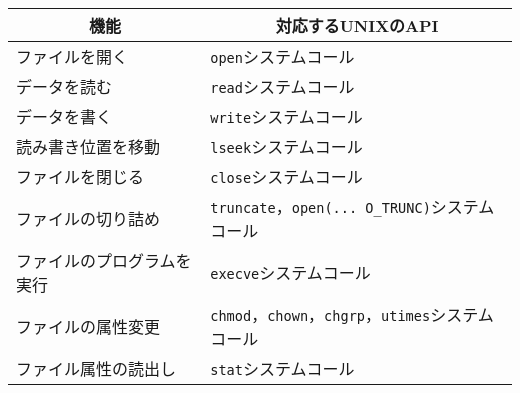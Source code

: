 \documentclass{standalone}
\def\|{\verb|} %|
\begin{document}
\begin{tabular}{l | l}\hline\hline
  \multicolumn{1}{c|}{機能} & \multicolumn{1}{c}{対応するUNIXのAPI}\\\hline
  ファイルを開く     & \|open|システムコール \\
  データを読む       & \|read|システムコール \\
  データを書く       & \|write|システムコール \\
  読み書き位置を移動 & \|lseek|システムコール \\
  ファイルを閉じる   & \|close|システムコール \\
  ファイルの切り詰め & \|truncate|，\|open(... O_TRUNC)|システムコール \\
  ファイルのプログラムを実行 & \|execve|システムコール \\
  ファイルの属性変更 & \|chmod|，\|chown|，\|chgrp|，\|utimes|システムコール \\
  ファイル属性の読出し & \|stat|システムコール \\
\end{tabular}
\end{document}
